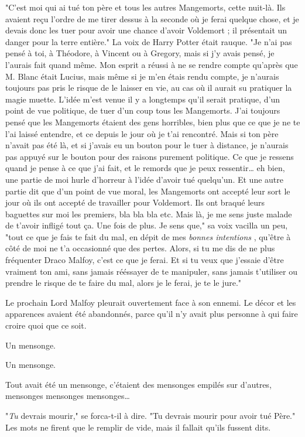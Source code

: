 "C'est moi qui ai tué ton père et tous les autres Mangemorts, cette nuit-là. Ils avaient reçu l'ordre de me tirer dessus à la seconde où je ferai quelque chose, et je devais donc les tuer pour avoir une chance d'avoir Voldemort ; il présentait un danger pour la terre entière." La voix de Harry Potter était rauque. "Je n'ai pas pensé à toi, à Théodore, à Vincent ou à Gregory, mais si j'y avais pensé, je l'aurais fait quand même. Mon esprit a réussi à ne se rendre compte qu'après que M. Blanc était Lucius, mais même si je m'en étais rendu compte, je n'aurais toujours pas pris le risque de le laisser en vie, au cas où il aurait su pratiquer la magie muette. L'idée m'est venue il y a longtemps qu'il serait pratique, d'un point de vue politique, de tuer d'un coup tous les Mangemorts. J'ai toujours pensé que les Mangemorts étaient des gens horribles, bien plus que ce que je ne te l'ai laissé entendre, et ce depuis le jour où je t'ai rencontré. Mais si ton père n'avait pas été là, et si j'avais eu un bouton pour le tuer à distance, je n'aurais pas appuyé sur le bouton pour des raisons purement politique. Ce que je ressens quand je pense à ce que j'ai fait, et le remords que je peux ressentir… eh bien, une partie de moi hurle d'horreur à l'idée d'avoir tué quelqu'un. Et une autre partie dit que d'un point de vue moral, les Mangemorts ont accepté leur sort le jour où ils ont accepté de travailler pour Voldemort. Ils ont braqué leurs baguettes sur moi les premiers, bla bla bla etc. Mais là, je me sens juste malade de t'avoir infligé tout ça. Une fois de plus. Je sens que," sa voix vacilla un peu, "tout ce que je fais te fait du mal, en dépit de mes \emph{bonnes intentions} , qu'être à côté de moi ne t'a occasionné que des pertes. Alors, si tu me dis de ne plus fréquenter Draco Malfoy, c'est ce que je ferai. Et si tu veux que j'essaie d'être vraiment ton ami, sans jamais rééssayer de te manipuler, sans jamais t'utiliser ou prendre le risque de te faire du mal, alors je le ferai, je te le jure."

Le prochain Lord Malfoy pleurait ouvertement face à son ennemi. Le décor et les apparences avaient été abandonnés, parce qu'il n'y avait plus personne à qui faire croire quoi que ce soit.

Un mensonge.

Un mensonge.

Tout avait été un mensonge, c'étaient des mensonges empilés sur d'autres, mensonges mensonges mensonges…

"\emph{Tu}  devrais mourir," se forca-t-il à dire. "Tu devrais mourir pour avoir tué Père." Les mots ne firent que le remplir de vide, mais il fallait qu'ils fussent dits.

